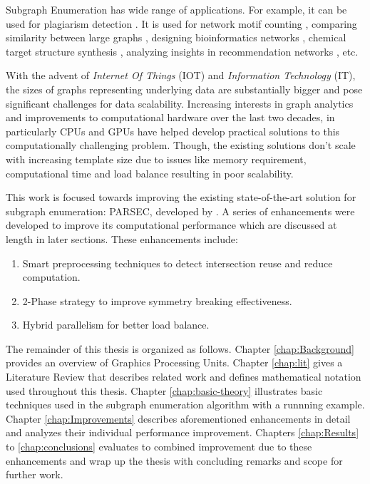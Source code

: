 Subgraph Enumeration has wide range of applications.
For example, it can be used for plagiarism detection \cite{quasi-clique-plagiarism}.
It is used for network motif counting \cite{motif-counting-application}, comparing similarity between large graphs \cite{large-graph-comparison-application}, designing bioinformatics networks \cite{bioinformatics-application}, chemical target structure synthesis \cite{chemical-target-application}, analyzing insights in recommendation networks \cite{recommendation-network-application}, etc.

With the advent of \textit{Internet Of Things} (IOT) and \textit{Information Technology} (IT), the sizes of graphs representing underlying data are substantially bigger and pose
significant
challenges for data scalability.
Increasing interests in graph analytics and improvements to computational hardware over the last two decades, in particularly CPUs and GPUs have helped develop practical solutions to this computationally challenging problem.
Though, the existing solutions don't scale with increasing template size due to issues like memory requirement, computational time and load balance resulting in poor scalability.

This work is focused towards improving the existing state-of-the-art solution for subgraph enumeration: PARSEC, developed by \cite{PARSEC_VD}.
A series of enhancements were developed to improve its computational performance which are discussed at length in later sections. These enhancements include:
\begin{enumerate}
    \item Smart preprocessing techniques to detect intersection reuse and reduce computation.
    \item 2-Phase strategy to improve symmetry breaking effectiveness.
    \item Hybrid parallelism for better load balance.
\end{enumerate}
The remainder of this thesis is organized as follows.
Chapter \ref{chap:Background} provides an overview of Graphics Processing Units.
Chapter \ref{chap:lit} gives a Literature Review that describes related work and defines mathematical notation used throughout this thesis.
Chapter \ref{chap:basic-theory} illustrates basic techniques used in the subgraph enumeration algorithm with a runnning example.
Chapter \ref{chap:Improvements} describes aforementioned enhancements in detail and analyzes their individual performance improvement.
Chapters \ref{chap:Results} to \ref{chap:conclusions} evaluates to combined improvement due to these enhancements and wrap up the thesis with concluding remarks and scope for further work.
